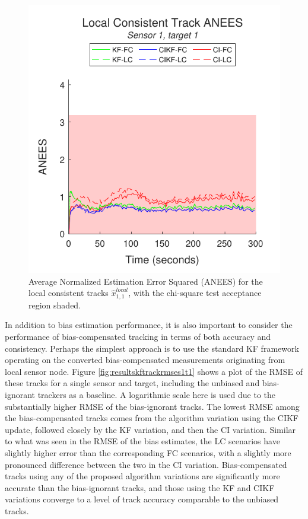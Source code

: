 \documentclass[journal]{IEEEtran}
\begin{document}
\begin{figure}[ht]
    \centering
    \includegraphics[scale=0.85]{localtrack_anees_s1t1.pdf}
    \caption{Average Normalized Estimation Error Squared (ANEES) for the local consistent tracks $\hat{x}_{1,1}^{local}$, with the chi-square test acceptance region shaded.}
    \label{fig:resultslocaltrackaneess1t1}
\end{figure}

In addition to bias estimation performance, it is also important to consider the performance of bias-compensated tracking in terms of both accuracy and consistency. Perhaps the simplest approach is to use the standard KF framework operating on the converted bias-compensated measurements originating from local sensor node. Figure \ref{fig:resultskftrackrmses1t1} shows a plot of the RMSE of these tracks for a single sensor and target, including the unbiased and bias-ignorant trackers as a baseline. A logarithmic scale here is used due to the substantially higher RMSE of the bias-ignorant tracks. The lowest RMSE among the bias-compensated tracks comes from the algorithm variation using the CIKF update, followed closely by the KF variation, and then the CI variation. Similar to what was seen in the RMSE of the bias estimates, the LC scenarios have slightly higher error than the corresponding FC scenarios, with a slightly more pronounced difference between the two in the CI variation. Bias-compensated tracks using any of the proposed algorithm variations are significantly more accurate than the bias-ignorant tracks, and those using the KF and CIKF variations converge to a level of track accuracy comparable to the unbiased tracks.
\end{document}
